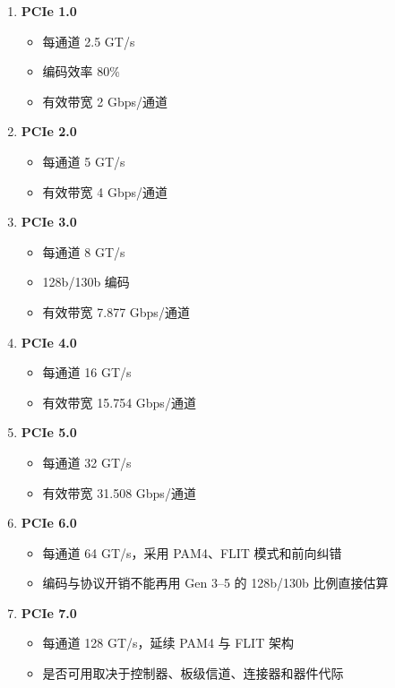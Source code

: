 \begin{enumerate}
  \item \textbf{PCIe 1.0}
    \begin{itemize}
      \item 每通道 2.5 GT/s
      \item 编码效率 80\%
      \item 有效带宽 2 Gbps/通道
    \end{itemize}

  \item \textbf{PCIe 2.0}
    \begin{itemize}
      \item 每通道 5 GT/s
      \item 有效带宽 4 Gbps/通道
    \end{itemize}

  \item \textbf{PCIe 3.0}
    \begin{itemize}
      \item 每通道 8 GT/s
      \item 128b/130b 编码
      \item 有效带宽 7.877 Gbps/通道
    \end{itemize}

  \item \textbf{PCIe 4.0}
    \begin{itemize}
      \item 每通道 16 GT/s
      \item 有效带宽 15.754 Gbps/通道
    \end{itemize}

  \item \textbf{PCIe 5.0}
    \begin{itemize}
      \item 每通道 32 GT/s
      \item 有效带宽 31.508 Gbps/通道
    \end{itemize}

  \item \textbf{PCIe 6.0}
    \begin{itemize}
      \item 每通道 64 GT/s，采用 PAM4、FLIT 模式和前向纠错
      \item 编码与协议开销不能再用 Gen 3--5 的 128b/130b 比例直接估算
    \end{itemize}

  \item \textbf{PCIe 7.0}
    \begin{itemize}
      \item 每通道 128 GT/s，延续 PAM4 与 FLIT 架构
      \item 是否可用取决于控制器、板级信道、连接器和器件代际
    \end{itemize}
\end{enumerate}

